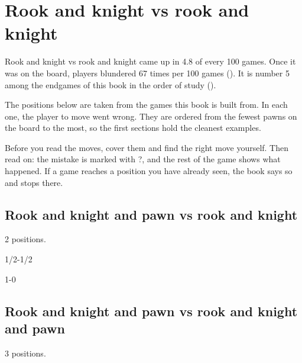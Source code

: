 \chapter{Rook and knight vs rook and knight}\label{ch:rook-and-knight-vs-rook-and-knight}
Rook and knight vs rook and knight came up in 4.8 of every 100 games. Once it was on the board, players blundered 67 times per 100 games (). It is number 5 among the endgames of this book in the order of study ().

The positions below are taken from the games this book is built from. In each one, the player to move went wrong. They are ordered from the fewest pawns on the board to the most, so the first sections hold the cleanest examples.

Before you read the moves, cover them and find the right move yourself. Then read on: the mistake is marked with ?, and the rest of the game shows what happened. If a game reaches a position you have already seen, the book says so and stops there.


\section{Rook and knight and pawn vs rook and knight}
2 positions.


1/2-1/2\par
{}

1-0\par
\section{Rook and knight and pawn vs rook and knight and pawn}
3 positions.


